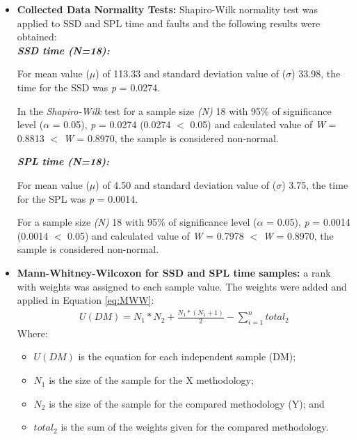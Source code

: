 \begin{itemize}

\item \textbf{Collected Data Normality Tests:} Shapiro-Wilk \cite{shaphirowilk65} normality test was applied to SSD and SPL time and faults and the following results were obtained:\\

\textbf{\textit{SSD time (\textit{N}=18):}}

For mean value ($\mu$) of 113.33 and standard deviation value of ($\sigma$) 33.98, the time for the SSD was \textit{p} = 0.0274.

In the \textit{Shapiro-Wilk} test for a sample size \textit{(N)} 18 with 95\% of significance level ($\alpha$ = 0.05), \textit{p} = 0.0274 (0.0274 $<$ 0.05) and calculated value of \textit{W} = 0.8813 $<$ \textit{W} = 0.8970, the sample is considered non-normal.

\textbf{\textit{SPL time (\textit{N}=18):}}

For mean value ($\mu$) of 4.50 and standard deviation value of ($\sigma$) 3.75, the time for the SPL was \textit{p} = 0.0014.

For a sample size \textit{(N)} 18 with 95\% of significance level ($\alpha$ = 0.05), \textit{p} = 0.0014 (0.0014 $<$ 0.05) and calculated value of \textit{W} = 0.7978 $<$ \textit{W} = 0.8970, the sample is considered non-normal.

\item \textbf{Mann-Whitney-Wilcoxon for SSD and SPL time samples:} a rank with weights was assigned to each sample value. The weights were added and applied in Equation \ref{eq:MWW}:
\small
\begin{equation}
\begin{split}
\label{eq:MWW}
U(DM) = N_1 * N_2 + \frac{N_1*(N_1+1)}{2} - \sum_{i=1}^{n} total_{2}
\end{split}
\end{equation}
\normalsize 
Where:
\begin{itemize}
\item \textit{$U(DM)$} is the equation for each independent sample (DM);
\item \textit{$N_1$} is the size of the sample for the X methodology;
\item \textit{$N_2$} is the size of the sample for the compared methodology (Y); and
\item \textit{$total_{2}$} is the sum of the weights given for the compared methodology.
\end{itemize}


\end{itemize}
